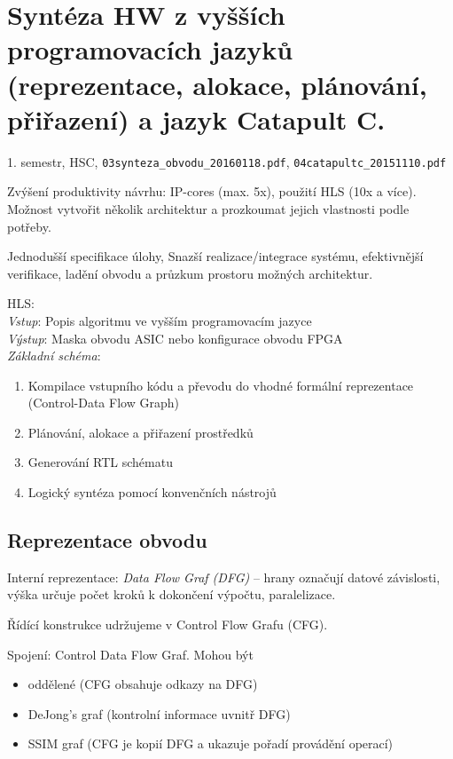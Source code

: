 \documentclass[a4paper, 11pt]{report}
\begin{document}
\chapter{Syntéza HW z vyšších programovacích jazyků (reprezentace, alokace, plánování, přiřazení) a jazyk Catapult C.} \label{cha:4}
1. semestr, HSC, \texttt{03synteza\_obvodu\_20160118.pdf}, \texttt{04catapultc\_20151110.pdf}

Zvýšení produktivity návrhu: IP-cores (max. 5x), použití HLS (10x a více). Možnost vytvořit několik architektur a prozkoumat jejich vlastnosti podle potřeby.

Jednodušší specifikace úlohy, Snazší realizace/integrace systému, efektivnější verifikace, ladění obvodu a průzkum prostoru možných architektur.

HLS:\\
\emph{Vstup}: Popis algoritmu ve vyšším programovacím jazyce\\
\emph{Výstup}: Maska obvodu ASIC nebo konfigurace obvodu FPGA\\
\emph{Základní schéma}:
\begin{enumerate}
	\item Kompilace vstupního kódu a převodu do vhodné formální reprezentace (Control-Data Flow Graph)
	\item Plánování, alokace a přiřazení prostředků
	\item Generování RTL schématu
	\item Logický syntéza pomocí konvenčních nástrojů
\end{enumerate}

\section{Reprezentace obvodu}

Interní reprezentace: \emph{Data Flow Graf (DFG)} -- hrany označují datové závislosti, výška určuje počet kroků k dokončení výpočtu, paralelizace.

Řídící konstrukce udržujeme v Control Flow Grafu (CFG).

Spojení: Control Data Flow Graf. Mohou být
\begin{itemize}
	\item oddělené (CFG obsahuje odkazy na DFG)
	\item DeJong's graf (kontrolní informace uvnitř DFG)
	\item SSIM graf (CFG je kopií DFG a ukazuje pořadí provádění operací)
\end{itemize}
\end{document}
